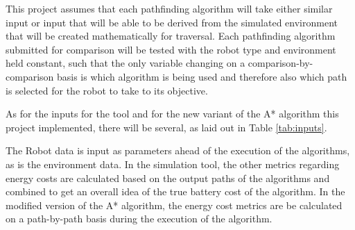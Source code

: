 \par
This project assumes that each pathfinding algorithm will take either similar input or input that will be able to be derived from the simulated environment that will be created mathematically for traversal. Each pathfinding algorithm submitted for comparison will be tested with the robot type and environment held constant, such that the only variable changing on a comparison-by-comparison basis is which algorithm is being used and therefore also which path is selected for the robot to take to its objective.
\par
As for the inputs for the tool and for the new variant of the A* algorithm this project implemented, there will be several, as laid out in Table \ref{tab:inputs}.
\par
The Robot data is input as parameters ahead of the execution of the algorithms, as is the environment data. In the simulation tool, the other metrics regarding energy costs are calculated based on the output paths of the algorithms and combined to get an overall idea of the true battery cost of the algorithm. In the modified version of the A* algorithm, the energy cost metrics are  be calculated on a path-by-path basis during the execution of the algorithm.
